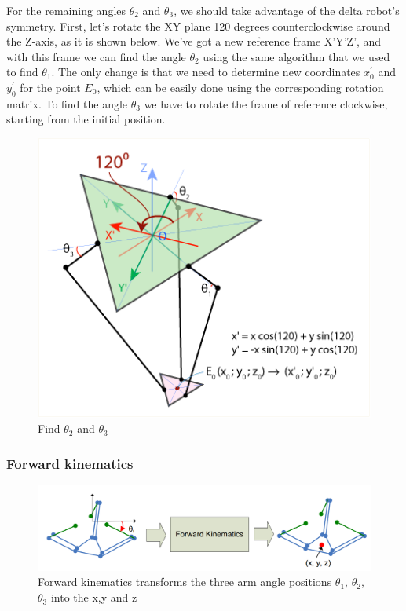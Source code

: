 For the remaining angles $\theta_{2}$ and $\theta_{3}$, we should take advantage of the delta robot's symmetry. First, let's rotate the XY plane 120 degrees counterclockwise around the Z-axis, as it is shown below. 
We've got a new reference frame X'Y'Z', and with this frame we can find the angle $\theta_{2}$ using the same algorithm that we used to find $\theta_{1}$. The only change is that we need to determine new coordinates $x^{'}_{0}$ and $y^{'}_{0}$ for the point $E_{0}$, which can be easily done using the corresponding rotation matrix. To find the angle $\theta_{3}$ we have to rotate the frame of reference clockwise, starting from the initial position.
\begin{figure}[H]
	\centering
	\includegraphics[width=\maxwidth{10cm}, keepaspectratio]{Chapters/Fig/find_theta2_and_theta3.png}
	\caption{Find $\theta_{2}$ and $\theta_{3}$}
	\label{fig:find_theta2_and_theta3}
\end{figure}

\subsubsection{Forward kinematics}

\begin{figure}[H]
	\centering
	\includegraphics[width=\maxwidth{15cm}, keepaspectratio]{Chapters/Fig/forward_kinematics.png}
	\caption{Forward kinematics transforms the three arm angle positions $\theta_{1}$, $\theta_{2}$, $\theta_{3}$ into the x,y and z}
	\label{fig:forward_kinematics}
\end{figure}

